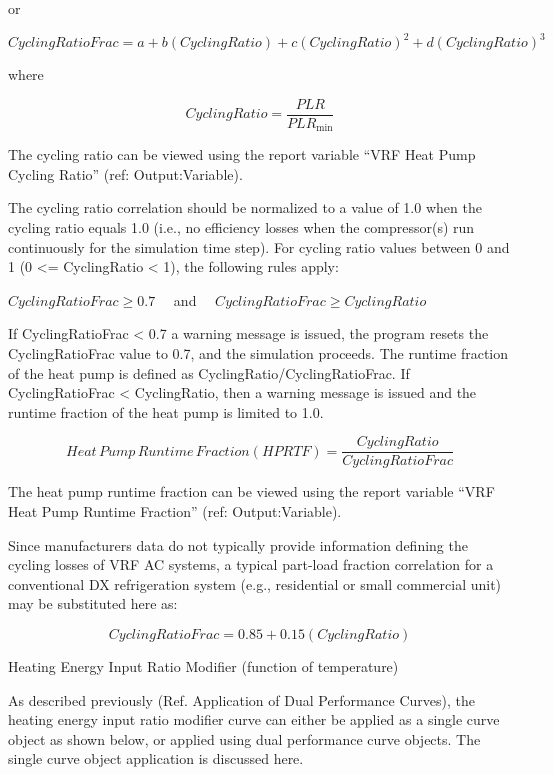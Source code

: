 or

\begin{equation}
  CyclingRatioFrac = a + b \left( CyclingRatio \right) + c \left( CyclingRatio \right)^2 + d \left( CyclingRatio \right)^3
\end{equation}

where

\begin{equation}
  CyclingRatio = \frac{PLR}{PLR_{\min }}
\end{equation}

The cycling ratio can be viewed using the report variable ``VRF Heat Pump Cycling Ratio'' (ref: Output:Variable).

The cycling ratio correlation should be normalized to a value of 1.0 when the cycling ratio equals 1.0 (i.e., no efficiency losses when the compressor(s) run continuously for the simulation time step). For cycling ratio values between 0 and 1 (0 <= CyclingRatio < 1), the following rules apply:

\(CyclingRatioFrac \ge 0.7\)   and   \(CyclingRatioFrac \ge CyclingRatio\)

If CyclingRatioFrac < 0.7 a warning message is issued, the program resets the CyclingRatioFrac value to 0.7, and the simulation proceeds. The runtime fraction of the heat pump is defined as CyclingRatio/CyclingRatioFrac. If CyclingRatioFrac < CyclingRatio, then a warning message is issued and the runtime fraction of the heat pump is limited to 1.0.

\begin{equation}
  Heat\,Pump\,Runtime\,Fraction \left( HPRTF \right) = \frac{CyclingRatio}{CyclingRatioFrac}
\end{equation}

The heat pump runtime fraction can be viewed using the report variable ``VRF Heat Pump Runtime Fraction'' (ref: Output:Variable).

Since manufacturers data do not typically provide information defining the cycling losses of VRF AC systems, a typical part-load fraction correlation for a conventional DX refrigeration system (e.g., residential or small commercial unit) may be substituted here as:

\begin{equation}
  CyclingRatioFrac = 0.85 + 0.15(CyclingRatio)
\end{equation}

Heating Energy Input Ratio Modifier (function of temperature)

As described previously (Ref. Application of Dual Performance Curves), the heating energy input ratio modifier curve can either be applied as a single curve object as shown below, or applied using dual performance curve objects. The single curve object application is discussed here.

